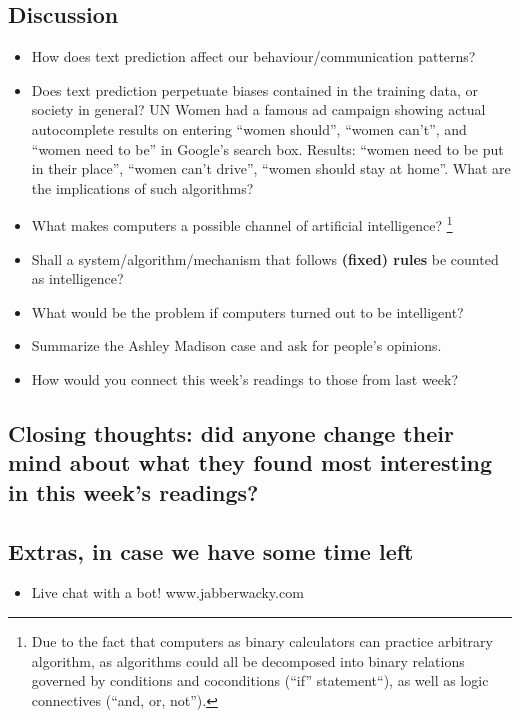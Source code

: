 \documentclass[12pt]{article}
\theoremstyle{definition}
\theoremstyle{plain}
\begin{document}
\subsection{Discussion}
\begin{itemize}
    \item How does text prediction affect our behaviour/communication patterns? 
    \item Does text prediction perpetuate biases contained in the training data, or society in general? 
    UN Women had a famous ad campaign showing actual autocomplete results on entering ``women should'', ``women can't'', and ``women need to be'' in Google's search box. Results: ``women need to be put in their place'', ``women can't drive'', ``women should stay at home''.
    What are the implications of such algorithms?

    \item What makes computers a possible channel of artificial
        intelligence?
        \footnote{Due to the fact that computers as binary calculators can
            practice arbitrary algorithm, as algorithms could all be decomposed
            into binary relations governed by conditions and coconditions
            (``if'' statement``), as well as logic connectives (``and, or,
            not'').
        }

    \item Shall a system/algorithm/mechanism that follows \textbf{(fixed) rules}
        be counted as intelligence?

    \item What would be the problem if computers turned out to be intelligent?

    \item Summarize the Ashley Madison case and ask for people's opinions.

    \item How would you connect this week's readings to those from last week?

\end{itemize}

\subsection{Closing thoughts: did anyone change their mind about what they found most interesting in this week's readings?}

\subsection{Extras, in case we have some time left}
\begin{itemize}
  \item Live chat with a bot! www.jabberwacky.com
\end{itemize}
\end{document}
